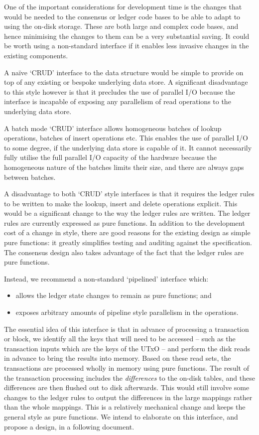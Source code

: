 \documentclass[11pt,a4paper]{article}
\begin{document}
One of the important considerations for development time is the changes that
would be needed to the consensus or ledger code bases to be able to adapt to
using the on-disk storage. These are both large and complex code bases, and
hence minimising the changes to them can be a very substantial saving. It could
be worth using a non-standard interface if it enables less invasive changes in
the existing components.

A na\"ive `CRUD' interface to the data structure would be simple to provide on
top of any existing or bespoke underlying data store. A significant
disadvantage to this style however is that it precludes the use of parallel I/O
because the interface is incapable of exposing any parallelism of read
operations to the underlying data store.

A batch mode `CRUD' interface allows homogeneous batches of {\sc lookup}
operations, batches of {\sc insert} operations etc. This enables the use of
parallel I/O to some degree, if the underlying data store is capable of it. It
cannot necessarily fully utilise the full parallel I/O capacity of the hardware
because the homogeneous nature of the batches limits their size, and there are
always gaps between batches.

A disadvantage to both `CRUD' style interfaces is that it requires the ledger
rules to be written to make the {\sc lookup}, {\sc insert} and {\sc delete}
operations explicit. This would be a significant change to the way the ledger
rules are written. The ledger rules are currently expressed as pure functions.
In addition to the development cost of a change in style, there are good reasons
for the existing design as simple pure functions: it greatly simplifies testing
and auditing against the specification. The consensus design also takes
advantage of the fact that the ledger rules are pure functions.

Instead, we recommend a non-standard `pipelined' interface which:
\begin{itemize}
\item allows the ledger state changes to remain as pure functions; and
\item exposes arbitrary amounts of pipeline style parallelism in the operations.
\end{itemize}
The essential idea of this interface is that in advance of processing a
transaction or block, we identify all the keys that will need to be accessed --
such as the transaction inputs which are the keys of the UTxO -- and perform
the disk reads in advance to bring the results into memory. Based on these
read sets, the transactions are processed wholly in memory using pure functions.
The result of the transaction processing includes the \emph{differences} to the
on-disk tables, and these differences are then flushed out to disk afterwards.
This would still involve some changes to the ledger rules to output the
differences in the large mappings rather than the whole mappings. This is a
relatively mechanical change and keeps the general style as pure functions.
We intend to elaborate on this interface, and propose a design, in a following
document.
\end{document}
